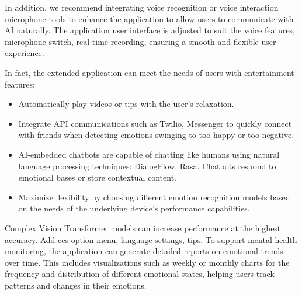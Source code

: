\documentclass[a4paper,13pt]{report}
\begin{document}
In addition, we recommend integrating voice recognition or voice interaction microphone tools to enhance the application to allow users to communicate with AI naturally. The application user interface is adjusted to suit the voice features, microphone switch, real-time recording, ensuring a smooth and flexible user experience.

\newpage In fact, the extended application can meet the needs of users with entertainment features:

\begin{itemize}
  \item Automatically play videos or tips with the user's relaxation.
  \item Integrate API communications such as Twilio, Messenger to quickly connect with friends when detecting emotions swinging to too happy or too negative.
  \item AI-embedded chatbots are capable of chatting like humans using natural language processing techniques: DialogFlow, Rasa. Chatbots respond to emotional bases or store contextual content.
   \item Maximize flexibility by choosing different emotion recognition models based on the needs of the underlying device's performance capabilities.
\end{itemize}

Complex Vision Transformer models can increase performance at the highest accuracy. Add ccs option menu, language settings, tips.
To support mental health monitoring, the application can generate detailed reports on emotional trends over time. This includes visualizations such as weekly or monthly charts for the frequency and distribution of different emotional states, helping users track patterns and changes in their emotions.
\end{document}
